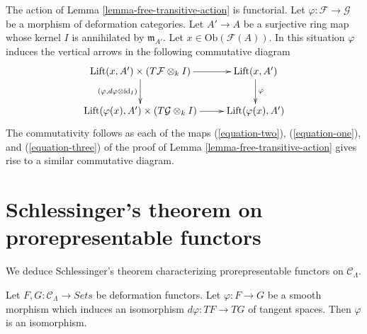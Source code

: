 \begin{remark}
\label{remark-free-transitive-action-functorial}
The action of Lemma \ref{lemma-free-transitive-action} is functorial.
Let $\varphi: \mathcal{F} \to \mathcal{G}$ be a morphism of deformation 
categories. Let $A' \to A$ be a surjective ring map whose kernel $I$ 
is annihilated by $\mathfrak m_{A'}$. Let
$x \in \text{Ob}(\mathcal{F}(A))$.
In this situation $\varphi$ induces the vertical arrows
in the following commutative diagram
$$
\xymatrix{
\text{Lift}(x, A') \times (T\mathcal{F} \otimes_k I)
\ar[d]_{(\varphi, d\varphi \otimes \text{id}_I)} \ar[r] &
\text{Lift}(x, A') \ar[d]^\varphi \\
\text{Lift}(\varphi(x), A') \times (T\mathcal{G} \otimes_k I) \ar[r] &
\text{Lift}(\varphi(x), A')
}
$$
The commutativity follows as each of the maps
(\ref{equation-two}), (\ref{equation-one}), and (\ref{equation-three})
of the proof of
Lemma \ref{lemma-free-transitive-action}
gives rise to a similar commutative diagram.
\end{remark}






\section{Schlessinger's theorem on prorepresentable functors}
\label{section-schlessingers-theorem}

\noindent
We deduce Schlessinger's theorem characterizing prorepresentable functors on 
$\mathcal{C}_\Lambda$.

\begin{lemma}
\label{lemma-minimal-smooth-morphism-functors}
Let $F, G: \mathcal{C}_\Lambda \to \textit{Sets}$ be deformation 
functors. Let $\varphi : F \to G$ be a smooth morphism which induces
an isomorphism $d\varphi : TF \to TG$ of tangent
spaces. Then $\varphi$ is an isomorphism.
\end{lemma}

